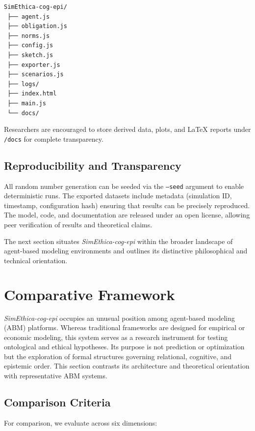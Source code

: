\documentclass[11pt]{article}
\begin{document}
\begin{verbatim}
SimEthica-cog-epi/
 ├── agent.js
 ├── obligation.js
 ├── norms.js
 ├── config.js
 ├── sketch.js
 ├── exporter.js
 ├── scenarios.js
 ├── logs/
 ├── index.html
 ├── main.js
 └── docs/
\end{verbatim}

Researchers are encouraged to store derived data, plots, and LaTeX reports under \texttt{/docs} for complete transparency.

\subsection{Reproducibility and Transparency}

All random number generation can be seeded via the \texttt{--seed} argument to enable deterministic runs.  
The exported datasets include metadata (simulation ID, timestamp, configuration hash) ensuring that results can be precisely reproduced.  
The model, code, and documentation are released under an open license, allowing peer verification of results and theoretical claims.

\noindent
The next section situates \textit{SimEthica-cog-epi} within the broader landscape of agent-based modeling environments and outlines its distinctive philosophical and technical orientation.
\section{Comparative Framework}

\textit{SimEthica-cog-epi} occupies an unusual position among agent-based modeling (ABM) platforms.  
Whereas traditional frameworks are designed for empirical or economic modeling, this system serves as a research instrument for testing ontological and ethical hypotheses.  
Its purpose is not prediction or optimization but the exploration of formal structures governing relational, cognitive, and epistemic order.  
This section contrasts its architecture and theoretical orientation with representative ABM systems.

\subsection{Comparison Criteria}

For comparison, we evaluate across six dimensions:
\end{document}
